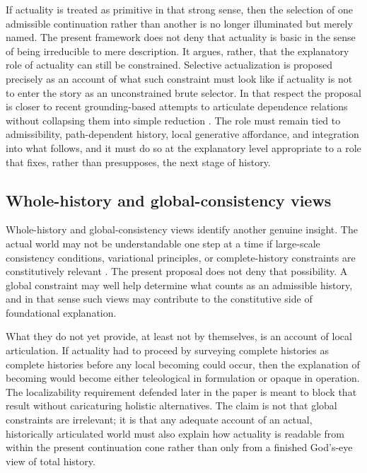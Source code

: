 \documentclass[11pt]{article}
\theoremstyle{foundation}
\begin{document}
If actuality is treated as primitive in that strong sense, then the selection of one admissible continuation rather than another is no longer illuminated but merely named. The present framework does not deny that actuality is basic in the sense of being irreducible to mere description. It argues, rather, that the explanatory role of actuality can still be constrained. Selective actualization is proposed precisely as an account of what such constraint must look like if actuality is not to enter the story as an unconstrained brute selector. In that respect the proposal is closer to recent grounding-based attempts to articulate dependence relations without collapsing them into simple reduction \citep{Fine2012,Schaffer2009,Rosen2010}. The role must remain tied to admissibility, path-dependent history, local generative affordance, and integration into what follows, and it must do so at the explanatory level appropriate to a role that fixes, rather than presupposes, the next stage of history.

\subsection{Whole-history and global-consistency views}

Whole-history and global-consistency views identify another genuine insight. The actual world may not be understandable one step at a time if large-scale consistency conditions, variational principles, or complete-history constraints are constitutively relevant \citep{Price1996,WheelerFeynman1945,WheelerFeynman1949,Cartwright1999}. The present proposal does not deny that possibility. A global constraint may well help determine what counts as an admissible history, and in that sense such views may contribute to the constitutive side of foundational explanation.

What they do not yet provide, at least not by themselves, is an account of local articulation. If actuality had to proceed by surveying complete histories as complete histories before any local becoming could occur, then the explanation of becoming would become either teleological in formulation or opaque in operation. The localizability requirement defended later in the paper is meant to block that result without caricaturing holistic alternatives. The claim is not that global constraints are irrelevant; it is that any adequate account of an actual, historically articulated world must also explain how actuality is readable from within the present continuation cone rather than only from a finished God's-eye view of total history.
\end{document}

